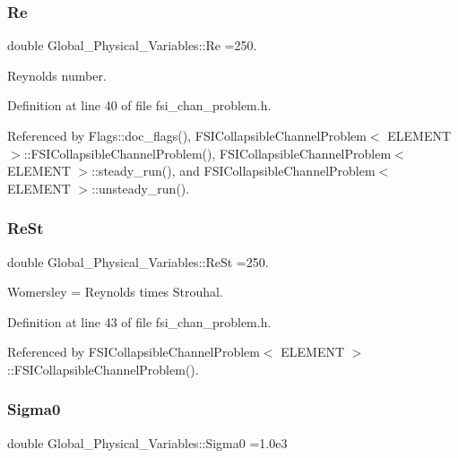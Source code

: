 \subsubsection{\texorpdfstring{Re}{Re}}
{\footnotesize\ttfamily double Global\+\_\+\+Physical\+\_\+\+Variables\+::\+Re =250.}



Reynolds number. 



Definition at line 40 of file fsi\+\_\+chan\+\_\+problem.\+h.



Referenced by Flags\+::doc\+\_\+flags(), F\+S\+I\+Collapsible\+Channel\+Problem$<$ E\+L\+E\+M\+E\+N\+T $>$\+::\+F\+S\+I\+Collapsible\+Channel\+Problem(), F\+S\+I\+Collapsible\+Channel\+Problem$<$ E\+L\+E\+M\+E\+N\+T $>$\+::steady\+\_\+run(), and F\+S\+I\+Collapsible\+Channel\+Problem$<$ E\+L\+E\+M\+E\+N\+T $>$\+::unsteady\+\_\+run().

\mbox{\label{namespaceGlobal__Physical__Variables_a085ee4bf968ffdd01a41b8c41864f907}} 
\subsubsection{\texorpdfstring{Re\+St}{ReSt}}
{\footnotesize\ttfamily double Global\+\_\+\+Physical\+\_\+\+Variables\+::\+Re\+St =250.}



Womersley = Reynolds times Strouhal. 



Definition at line 43 of file fsi\+\_\+chan\+\_\+problem.\+h.



Referenced by F\+S\+I\+Collapsible\+Channel\+Problem$<$ E\+L\+E\+M\+E\+N\+T $>$\+::\+F\+S\+I\+Collapsible\+Channel\+Problem().

\mbox{\label{namespaceGlobal__Physical__Variables_a417dc688a70c4f06ef0faed047068ba2}} 
\subsubsection{\texorpdfstring{Sigma0}{Sigma0}}
{\footnotesize\ttfamily double Global\+\_\+\+Physical\+\_\+\+Variables\+::\+Sigma0 =1.\+0e3}



